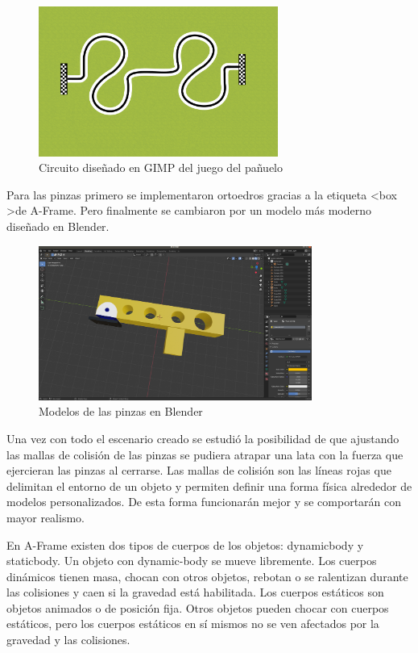 \begin{figure}[H]
  \centering
 \includegraphics[width=0.7\textwidth, height=0.4\textwidth]{chapters/images/handkerchief.png}
  \caption{Circuito diseñado en GIMP del juego del pañuelo}
\end{figure}

Para las pinzas  primero se implementaron ortoedros gracias a la etiqueta  \textless box \textgreater de A-Frame. Pero finalmente se cambiaron por un modelo más moderno diseñado en Blender.

\begin{figure}[H]
  \centering
 \includegraphics[width=0.8\textwidth, height=0.5\textwidth]{chapters/images/pinza.png}
  \caption{Modelos de las pinzas en Blender}
\end{figure}

Una vez con todo el escenario creado se estudió la posibilidad de que ajustando  las mallas de colisión de las pinzas se pudiera atrapar una lata con la fuerza que ejercieran las pinzas al cerrarse. 
Las mallas de colisión son las líneas rojas que delimitan el entorno de un objeto y permiten definir una forma física alrededor de modelos personalizados. De esta forma funcionarán mejor y se comportarán con mayor realismo.

En A-Frame existen dos tipos de cuerpos de los objetos: dynamic\-body y static\-body. Un objeto con dynamic-body  se mueve libremente. Los cuerpos dinámicos tienen masa, chocan con otros objetos, rebotan o se ralentizan durante las colisiones y caen si la gravedad está habilitada.
Los cuerpos estáticos son objetos animados o de posición fija. Otros objetos pueden chocar con cuerpos estáticos, pero los cuerpos estáticos en sí mismos no se ven afectados por la gravedad y las colisiones.

